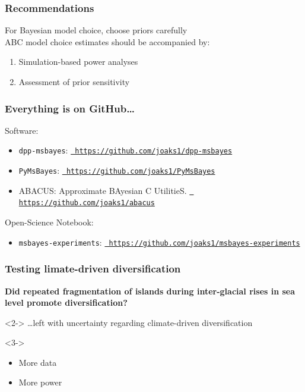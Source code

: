 \begin{frame}
    \frametitle{Recommendations}
    For Bayesian model choice, choose priors carefully\\
    \bigskip
    ABC model choice estimates should be accompanied by:
    \begin{enumerate}
        \item Simulation-based power analyses
        \item Assessment of prior sensitivity
    \end{enumerate}
\end{frame}

\begin{frame}
    \frametitle{Everything is on GitHub\ldots}
    Software:\\
    \begin{itemize}
        \item \texttt{dpp-msbayes}:
            \href{https://github.com/joaks1/dpp-msbayes}{\tt
            https://github.com/joaks1/dpp-msbayes}

        \item \texttt{PyMsBayes}:
            \href{https://github.com/joaks1/PyMsBayes}{\tt
            https://github.com/joaks1/PyMsBayes}

        \item ABACUS: Approximate BAyesian C UtilitieS.
            \href{https://github.com/joaks1/abacus}{\tt
            https://github.com/joaks1/abacus}
    \end{itemize}

    \medskip
    Open-Science Notebook:\\
    \begin{itemize}
        \item \texttt{msbayes-experiments}:
            \href{https://github.com/joaks1/msbayes-experiments}{\tt
            https://github.com/joaks1/msbayes-experiments}
    \end{itemize}
\end{frame}


\begin{frame}
    \frametitle{Testing limate-driven diversification}
    \textbf{Did repeated fragmentation of islands during inter-glacial rises in sea level
    promote diversification?}\\

    \bigskip
    \begin{uncoverenv}<2->
    \ldots left with uncertainty regarding climate-driven diversification \\
    \end{uncoverenv}

    \begin{uncoverenv}<3->
    \begin{itemize}
            \item More data
    
            \item More power 
    \end{itemize}
    \end{uncoverenv}
\end{frame}

